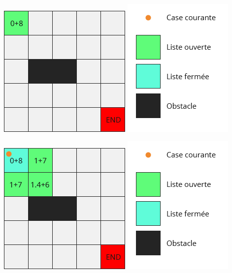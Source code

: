 \documentclass[11pt]{beamer}
\begin{document}
		\begin{frame}
			\begin{center}
				\includegraphics[scale=0.5]{images/Algo_2.png}
				\hspace{1cm}
				\includegraphics[scale=0.5]{images/Legend.png}
			\end{center}
		\end{frame}
		\begin{frame}
			\begin{center}
				\includegraphics[scale=0.5]{images/Algo_3.png}
				\hspace{1cm}
				\includegraphics[scale=0.5]{images/Legend.png}
			\end{center}
		\end{frame}
\end{document}
